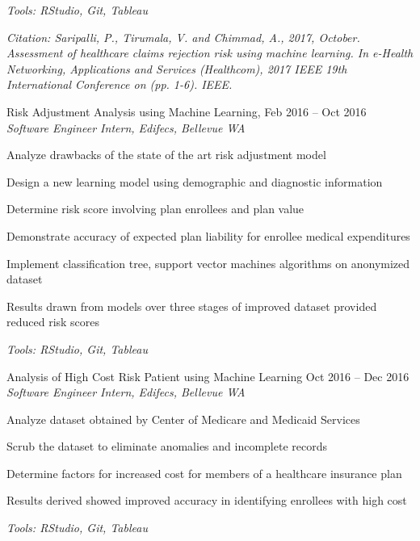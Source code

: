 \documentclass{article}
\newcommand{\project}[4]{{
\vspace*{2pt}%
\textbf{#1} #2 \hfill #3\\ \textit{#4} \vspace*{2pt}}
}
\renewcommand{\labelitemii}{
$\vcenter{\hbox{\tiny$\bullet$}}$\hspace*{-3pt}
}
\newenvironment{bullet-list-minor}{
\begin{list}{\labelitemii}{\setlength\leftmargin{15pt} 
\topsep 0pt \itemsep -2pt}}{\vspace*{4pt}\end{list}
}
\begin{document}
{\begin{bullet-list-minor}
	\textit{Tools: RStudio, Git, Tableau}
	
	\textit{Citation: Saripalli, P., Tirumala, V. and Chimmad, A., 2017, October. Assessment of healthcare claims rejection risk using machine learning. In e-Health Networking, Applications and Services (Healthcom), 2017 IEEE 19th International Conference on (pp. 1-6). IEEE.}
    \end{bullet-list-minor}

   \newpage
    \project{}{Risk Adjustment Analysis using Machine Learning,}{Feb 2016 – Oct 2016}{ Software Engineer Intern, Edifecs, Bellevue WA}
	\begin{bullet-list-minor}
	\item Analyze drawbacks of the state of the art risk adjustment model 
	\item Design a new learning model using demographic and diagnostic information
	\item Determine risk score involving plan enrollees and plan value
	\item Demonstrate accuracy of expected plan liability for enrollee medical expenditures
	\item Implement classification tree, support vector machines algorithms on anonymized dataset
	\item Results drawn from models over three stages of improved dataset provided reduced risk scores	
	
	\textit{Tools: RStudio, Git, Tableau}
    \end{bullet-list-minor}
    
    \project{}{Analysis of High Cost Risk Patient using Machine Learning}{Oct 2016 – Dec 2016}{ Software Engineer Intern, Edifecs, Bellevue WA}
	\begin{bullet-list-minor}
	\item Analyze dataset obtained by Center of Medicare and Medicaid Services
	\item Scrub the dataset to eliminate anomalies and incomplete records
	\item Determine factors for increased cost for members of a healthcare insurance plan
	\item Results derived showed improved accuracy in identifying enrollees with high cost	
	
	\textit{Tools: RStudio, Git, Tableau}
    \end{bullet-list-minor}

\vspace*{4pt}%

}
\end{document}
